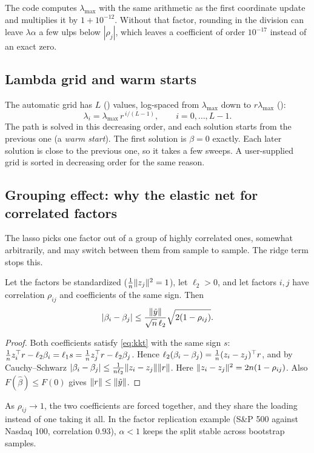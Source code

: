 \documentclass[11pt,a4paper]{article}
\begin{document}
The code computes $\lambda_{\max}$ with the same arithmetic as the first coordinate update
and multiplies it by $1+10^{-12}$. Without that factor, rounding in the division can leave
$\lambda\alpha$ a few ulps below $|\rho_j|$, which leaves a coefficient of order $10^{-17}$
instead of an exact zero.

\subsection{Lambda grid and warm starts}
The automatic grid has $L$ () values, log-spaced from $\lambda_{\max}$ down to
$r\lambda_{\max}$ ():
\[
  \lambda_i=\lambda_{\max}\,r^{\,i/(L-1)},\qquad i=0,\dots,L-1 .
\]
The path is solved in this decreasing order, and each solution starts from the previous one
(a \emph{warm start}). The first solution is $\beta=0$ exactly. Each later solution is close
to the previous one, so it takes a few sweeps. A user-supplied grid is sorted in decreasing
order for the same reason.

\subsection{Grouping effect: why the elastic net for correlated factors}

The lasso picks one factor out of a group of highly correlated ones, somewhat arbitrarily,
and may switch between them from sample to sample. The ridge term stops this.

\begin{proposition}[Grouping]\label{prop:grouping}
Let the factors be standardized ($\frac1n\lVert z_j\rVert^2=1$), let $\ell_2>0$, and let factors $i,j$
have correlation $\rho_{ij}$ and coefficients of the same sign. Then
\[
  |\beta_i-\beta_j|\le\frac{\lVert \tilde y\rVert}{\sqrt n\,\ell_2}\sqrt{2(1-\rho_{ij})}.
\]
\end{proposition}
\begin{proof}
Both coefficients satisfy \eqref{eq:kkt} with the same sign $s$:
$\frac1nz_i^\top r-\ell_2\beta_i=\ell_1s=\frac1nz_j^\top r-\ell_2\beta_j$. Hence
$\ell_2(\beta_i-\beta_j)=\frac1n(z_i-z_j)^\top r$, and by Cauchy--Schwarz
$|\beta_i-\beta_j|\le\frac1{n\ell_2}\lVert z_i-z_j\rVert\lVert r\rVert$. Here
$\lVert z_i-z_j\rVert^2=2n(1-\rho_{ij})$. Also $F(\hat\beta)\le F(0)$ gives
$\lVert r\rVert\le\lVert \tilde y\rVert$.
\end{proof}
As $\rho_{ij}\to1$, the two coefficients are forced together, and they share the loading
instead of one taking it all. In the factor replication example (S\&P 500 against Nasdaq
100, correlation $0.93$), $\alpha<1$ keeps the split stable across bootstrap samples.
\end{document}
